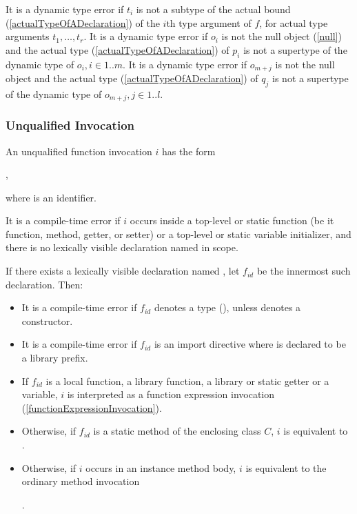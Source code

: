 \documentclass[makeidx]{article}
\begin{document}

\LMHash{}%
It is a dynamic type error if $t_i$ is not a subtype of the actual bound
(\ref{actualTypeOfADeclaration})
of the $i$th type argument of $f$, for actual type arguments $t_1, \ldots, t_r$.
It is a dynamic type error if $o_i$ is not the null object (\ref{null})
and the actual type
(\ref{actualTypeOfADeclaration})
of $p_i$ is not a supertype of the dynamic type of $o_i, i \in 1 .. m$.
It is a dynamic type error if $o_{m+j}$ is
not the null object and the actual type
(\ref{actualTypeOfADeclaration})
of $q_j$ is not a supertype of the dynamic type of $o_{m+j}, j \in 1 .. l$.


\subsubsection{Unqualified Invocation}

\LMHash{}%
An unqualified function invocation $i$ has the form

,

\noindent
where \id{} is an identifier.


\LMHash{}%
It is a compile-time error if $i$ occurs inside a top-level or static function
(be it function, method, getter, or setter)
or a top-level or static variable initializer,
and there is no lexically visible declaration named \id{} in scope.

\LMHash{}%
If there exists a lexically visible declaration named \id,
let $f_{id}$ be the innermost such declaration.
Then:
\begin{itemize}
\item It is a compile-time error if $f_{id}$ denotes a type
  (),
  unless \id{} denotes a constructor.
\item It is a compile-time error if $f_{id}$ is an import directive
  where \id{} is declared to be a library prefix.
\item
If $f_{id}$ is
a local function,
a library function,
a library or static getter or a variable,
$i$ is interpreted as a function expression invocation
(\ref{functionExpressionInvocation}).
\item
Otherwise, if $f_{id}$ is a static method of the enclosing class $C$,
$i$ is equivalent to
.
\item Otherwise, if $i$ occurs in an instance method body,
$i$ is equivalent to the ordinary method invocation

.
\end{itemize}
\end{document}
